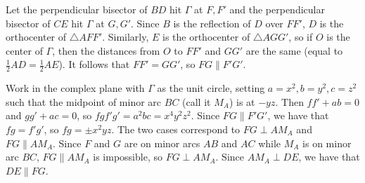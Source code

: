 Let the perpendicular bisector of $BD$ hit $\Gamma$ at $F,F'$ and the perpendicular bisector of $CE$ hit $\Gamma$ at $G,G'$. Since $B$ is the reflection of $D$ over $FF'$, $D$ is the orthocenter of $\triangle{AFF'}$. Similarly, $E$ is the orthocenter of $\triangle{AGG'}$, so if $O$ is the center of $\Gamma$, then the distances from $O$ to $FF'$ and $GG'$ are the same (equal to $\frac{1}{2}AD=\frac{1}{2}AE$). It follows that $FF'=GG'$, so $FG\parallel F'G'$.

Work in the complex plane with $\Gamma$ as the unit circle, setting $a=x^2,b=y^2,c=z^2$ such that the midpoint of minor arc $BC$ (call it $M_A$) is at $-yz$. Then $ff'+ab=0$ and $gg'+ac=0$, so $fgf'g'=a^2bc=x^4y^2z^2$. Since $FG\parallel F'G'$, we have that $fg=f'g'$, so $fg=\pm x^2yz$. The two cases correspond to $FG\perp AM_A$ and $FG\parallel AM_A$. Since $F$ and $G$ are on minor arcs $AB$ and $AC$ while $M_A$ is on minor arc $BC$, $FG\parallel AM_A$ is impossible, so $FG\perp AM_A$. Since $AM_A\perp DE$, we have that $DE\parallel FG$.